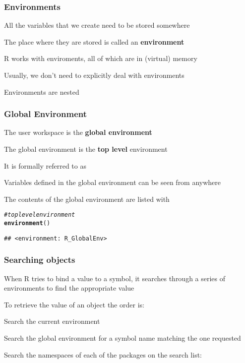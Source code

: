 \documentclass[12pt]{beamer}\usepackage[]{graphicx}\usepackage[]{color}
\makeatletter
\newcommand{\hlcom}[1]{\textcolor[rgb]{0.678,0.584,0.686}{\textit{#1}}}%
\newcommand{\hlstd}[1]{\textcolor[rgb]{0.345,0.345,0.345}{#1}}%
\newcommand{\hlkwd}[1]{\textcolor[rgb]{0.737,0.353,0.396}{\textbf{#1}}}%
\newenvironment{kframe}{%
 \def\at@end@of@kframe{}%
 \ifinner\ifhmode%
  \def\at@end@of@kframe{\end{minipage}}%
  \begin{minipage}{\columnwidth}%
 \fi\fi%
 \def\FrameCommand##1{\hskip\@totalleftmargin \hskip-\fboxsep
 \colorbox{shadecolor}{##1}\hskip-\fboxsep
     \hskip-\linewidth \hskip-\@totalleftmargin \hskip\columnwidth}%
 \MakeFramed {\advance\hsize-\width
   \@totalleftmargin\z@ \linewidth\hsize
   \@setminipage}}%
 {\par\unskip\endMakeFramed%
 \at@end@of@kframe}
\newenvironment{knitrout}{}{} %
\makeatother
\begin{document}

\begin{frame}
\frametitle{Environments}

\bbi
  \item All the variables that we create need to be stored somewhere
  \item The place where they are stored is called an \textbf{environment}
  \item R works with enviroments, all of which are in (virtual) memory
  \item Usually, we don't need to explicitly deal with environments
  \item Environments are nested
\ei

\end{frame}


\begin{frame}[fragile]
\frametitle{Global Environment}

\bi
  \item The user workspace is the \textbf{global environment}
  \item The global environment is the \textbf{top level} environment
  \item It is formally referred to as 
  \item Variables defined in the global environment can be seen from anywhere
  \item The contents of the global environment are listed with 
\ei

\begin{knitrout}\footnotesize
{}\color{fgcolor}\begin{kframe}
\begin{alltt}
\hlcom{# top level environment}
\hlkwd{environment}\hlstd{()}
\end{alltt}
\begin{verbatim}
## <environment: R_GlobalEnv>
\end{verbatim}
\end{kframe}
\end{knitrout}

\end{frame}


\begin{frame}
\frametitle{Searching objects}

\bi
  \item When R tries to bind a value to a symbol, it searches through a series of environments to find the appropriate value
  \item To retrieve the value of an object the order is:
  \item Search the current environment
  \item Search the global environment for a symbol name matching the one requested
  \item Search the namespaces of each of the packages on the search list: {\hilit {}}
\ei

\end{frame}
\end{document}
